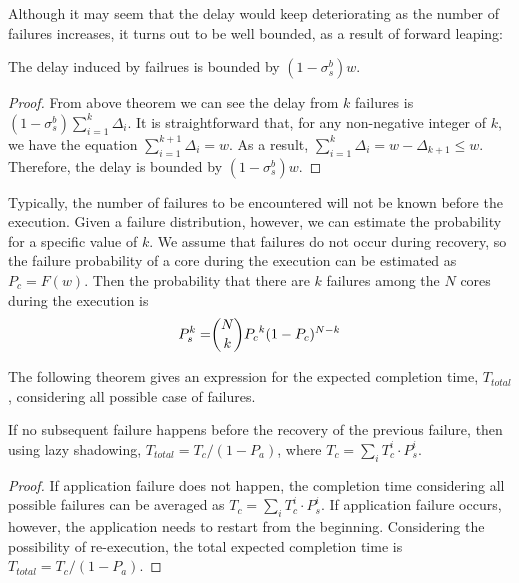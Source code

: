 Although it may seem that the delay would keep deteriorating as the number of failures increases, 
it turns out to be well bounded, as a result of forward leaping:

\begin{corollary}
The delay induced by failrues is bounded by $(1-\sigma_s^b)w$.
\end{corollary}
\begin{proof}
From above theorem we can see the delay from $k$ failures is $(1-\sigma_s^b)\sum_{i=1}^k\Delta_i$. It is straightforward that, for any non-negative integer of $k$, we have the equation $\sum_{i=1}^{k+1}\Delta_i= w$. As a result, 
$\sum_{i=1}^{k}\Delta_i = w - \Delta_{k+1} \le w$. Therefore, the delay is bounded by $(1-\sigma_s^b)w$.
\end{proof}

Typically, the number of failures to be encountered will not be known before the execution. Given a failure distribution, however, we can estimate the probability for a specific value of $k$. We assume that failures do not occur during recovery, so the failure probability of a core during the execution can be estimated as $P_c = F(w)$. Then the probability that there are $k$ failures among the $N$ cores during the execution is 
\begin{equation}
\begin{split}
P_s^{k}= & \dbinom{N}{k}{P_c}^k(1-P_c)^{N-k} \\
\end{split}
\end{equation}

The following theorem gives an expression for the expected completion time, $T_{total}$, considering all possible case of failures. 

\begin{theorem}
If no subsequent failure happens before the recovery of the previous failure, then using lazy shadowing,
$T_{total} = T_{c} / (1 - P_a)$, where $T_{c} = \sum_{i} T_{c}^{i} \cdot P_s^{i}$.
\end{theorem}
\begin{proof}
If application failure does not happen, the completion time considering all possible failures can be averaged as $T_{c} = \sum_{i} T_{c}^{i} \cdot P_s^{i}$. If application failure occurs, however, the application needs to restart from the beginning. Considering the possibility of re-execution, the total expected completion time is $T_{total} = T_{c} / (1 - P_a)$.
\end{proof}


